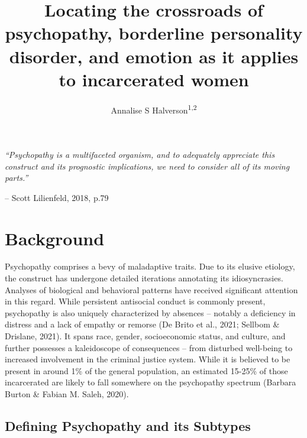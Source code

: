 \documentclass[
  man,floatsintext]{apa7}
\title{Locating the crossroads of psychopathy, borderline personality disorder, and emotion as it applies to incarcerated women}
\author{Annalise S Halverson\textsuperscript{1,2}}
\date{}
\affiliation{\vspace{0.5cm}\textsuperscript{1} University of Chicago\\\textsuperscript{2} Department of Psychology}
\begin{document}
\maketitle

\emph{``Psychopathy is a multifaceted organism, and to adequately appreciate this construct and its prognostic implications, we need to consider all of its moving parts.''}

-- Scott Lilienfeld, 2018, p.79

\hypertarget{background}{%
\section{Background}\label{background}}

Psychopathy comprises a bevy of maladaptive traits. Due to its elusive etiology, the construct has undergone detailed iterations annotating its idiosyncrasies. Analyses of biological and behavioral patterns have received significant attention in this regard. While persistent antisocial conduct is commonly present, psychopathy is also uniquely characterized by absences -- notably a deficiency in distress and a lack of empathy or remorse (De Brito et al., 2021; Sellbom \& Drislane, 2021). It spans race, gender, socioeconomic status, and culture, and further possesses a kaleidoscope of consequences -- from disturbed well-being to increased involvement in the criminal justice system. While it is believed to be present in around 1\% of the general population, an estimated 15-25\% of those incarcerated are likely to fall somewhere on the psychopathy spectrum (Barbara Burton \& Fabian M. Saleh, 2020).

\hypertarget{defining-psychopathy-and-its-subtypes}{%
\subsection{Defining Psychopathy and its Subtypes}\label{defining-psychopathy-and-its-subtypes}}
\end{document}
